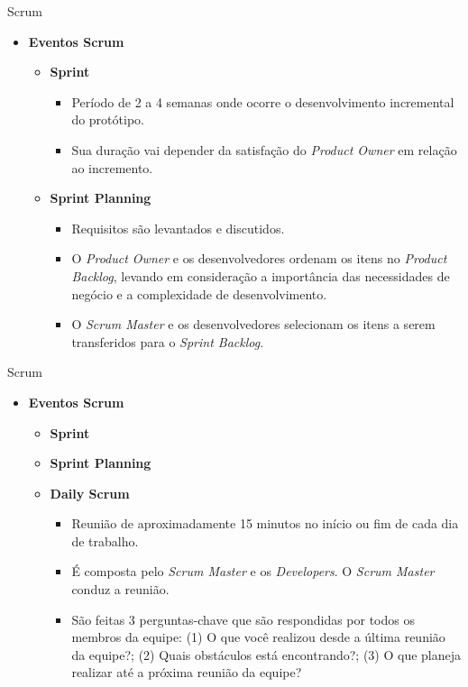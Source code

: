 \documentclass{beamer}
\begin{document}
\begin{frame}{Scrum}
	\begin{itemize}
		\item \textbf{Eventos Scrum}
			\begin{itemize}
				\item \textbf{Sprint}
					\begin{itemize}
						\justifying
						\item<1> Período de 2 a 4 semanas onde ocorre o desenvolvimento incremental do protótipo.
						\item<1> Sua duração vai depender da satisfação do \textit{Product Owner} em relação ao incremento.
					\end{itemize}
				\item<2-> \textbf{Sprint Planning}
					\begin{itemize}
						\justifying
						\item<2> Requisitos são levantados e discutidos.
						\item<2> O \textit{Product Owner} e os desenvolvedores ordenam os itens no \textit{Product Backlog}, levando em consideração a importância das necessidades de negócio e a complexidade de desenvolvimento.
						\item<2> O \textit{Scrum Master} e os desenvolvedores selecionam os itens a serem transferidos para o \textit{Sprint Backlog}.
					\end{itemize}
			\end{itemize}
	\end{itemize}
\end{frame}

\begin{frame}{Scrum}
	\begin{itemize}
		\item \textbf{Eventos Scrum}
		\begin{itemize}
			\item \textbf{Sprint}
			\item \textbf{Sprint Planning}
			\item \textbf{Daily Scrum}
			\begin{itemize}
				\justifying
				\item Reunião de aproximadamente 15 minutos no início ou fim de cada dia de trabalho.
				\item É composta pelo \textit{Scrum Master} e os \textit{Developers}. O \textit{Scrum Master} conduz a reunião.
				\item São feitas 3 perguntas-chave que são respondidas por todos os membros da equipe: (1) O que você realizou desde a última reunião da equipe?; (2) Quais obstáculos está encontrando?; (3) O que planeja realizar até a próxima reunião da equipe?
			\end{itemize}
		\end{itemize}
	\end{itemize}
\end{frame}
\end{document}
